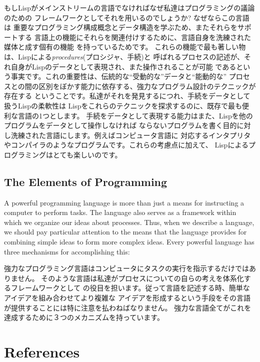\documentclass[oneside]{book}
\newcommand{\newterm}[1]{\index{#1}\emph{#1}}
\begin{document}
もしLispがメインストリームの言語でなければなぜ私達はプログラミングの議論のための
フレームワークとしてそれを用いるのでしょうか? なぜならこの言語は
重要なプログラミング構成概念とデータ構造を学ぶため、またそれらをサポートする
言語上の機能にそれらを関連付けするために、言語自身を洗練された媒体と成す個有の機能
を持っているためです。
これらの機能で最も著しい物は、Lispによる\newterm{procedures}(プロシジャ、手続)と
呼ばれるプロセスの記述が、それ自身がLispのデータとして表現され、また操作されることが可能
であるという事実です。これの重要性は、伝統的な``受動的な''データと``能動的な''
プロセスとの間の区別をぼかす能力に依存する、強力なプログラム設計のテクニックが存在する
ということです。私達がそれを発見するにつれ、手続をデータとして扱うLispの柔軟性は
Lispをこれらのテクニックを探求するのに、既存で最も便利な言語の1つとします。
手続をデータとして表現する能力はまた、Lispを他のプログラムをデータとして操作しなければ
ならないプログラムを書く目的に対し洗練された言語にします。例えばコンピュータ言語に
対応するインタプリタやコンパイラのようなプログラムです。これらの考慮点に加えて、
Lispによるプログラミングはとても楽しいのです。



\label{Section 1.1}
\section{The Elements of Programming}

A powerful programming language is more than just a means for instructing a
computer to perform tasks.  The language also serves as a framework within
which we organize our ideas about processes.  Thus, when we describe a
language, we should pay particular attention to the means that the language
provides for combining simple ideas to form more complex ideas.  Every powerful
language has three mechanisms for accomplishing this:

強力なプログラミング言語はコンピュータにタスクの実行を指示するだけではありません。
そのような言語は私達がプロセスについての自らの考えを体系化するフレームワークとして
の役目を担います。従って言語を記述する時、簡単なアイデアを組み合わせてより複雑な
アイデアを形成するという手段をその言語が提供することには特に注意を払わねばなりません。
強力な言語全てがこれを達成するために３つのメカニズムを持っています。

\chapter*{References}
\label{References}
\end{document}
